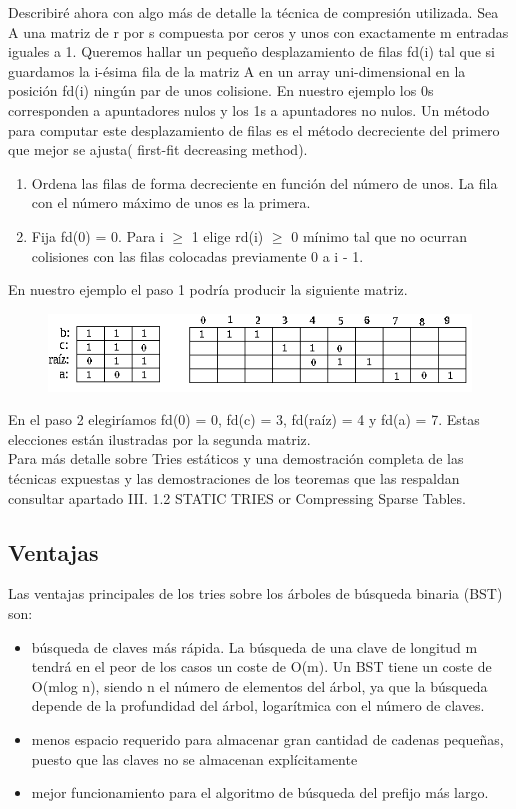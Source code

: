 \documentclass[es]{ifirak}
\begin{document}
{Describiré ahora con algo más de detalle la técnica de compresión utilizada.
Sea A una matriz de r por s compuesta por ceros y unos con exactamente m entradas iguales a 1. Queremos hallar un pequeño desplazamiento de filas fd(i) tal que si guardamos la i-ésima fila de la matriz A en un array uni-dimensional en la posición fd(i) ningún par de unos colisione. En nuestro ejemplo los 0s corresponden a apuntadores nulos y los 1s a apuntadores no nulos. Un método para computar este desplazamiento de filas es el método decreciente del primero que mejor se ajusta( first-fit decreasing method).\\

\begin{enumerate}
	\item Ordena las filas de forma decreciente en función del número de unos. La fila con el número máximo de unos es la primera.
	
	\item Fija fd(0) = 0. Para i $\geq$ 1 elige rd(i) $\geq$ 0 mínimo tal que no ocurran colisiones con las filas colocadas previamente 0 a i - 1.
\end{enumerate}
}
\large{
En nuestro ejemplo el paso 1 podría producir la siguiente matriz.\\


\begin{figure}[hbtp]
	\centering
	\includegraphics[width=1\textwidth]{trie5.png}
\end{figure}

En el paso 2 elegiríamos fd(0) = 0, fd(c) = 3, fd(raíz) = 4 y fd(a) = 7. Estas elecciones están ilustradas por la segunda matriz.\\

Para más detalle sobre Tries estáticos y una demostración completa de las técnicas expuestas y las demostraciones de los teoremas que las respaldan consultar \cite{key-2} apartado III. 1.2 STATIC TRIES or Compressing Sparse Tables.
}
\subsection{Ventajas}
\large{
	Las ventajas principales de los tries sobre los árboles de búsqueda binaria (BST) son:
\begin{itemize}
	\item búsqueda de claves más rápida. La búsqueda de una clave de longitud m tendrá en el peor de los casos un coste de O(m). Un BST tiene un coste de O(mlog n), siendo n el número de elementos del árbol, ya que la búsqueda depende de la profundidad del árbol, logarítmica con el número de claves.
	\item menos espacio requerido para almacenar gran cantidad de cadenas pequeñas, puesto que las claves no se almacenan explícitamente
	\item mejor funcionamiento para el algoritmo de búsqueda del prefijo más largo.
\end{itemize}}
\end{document}
